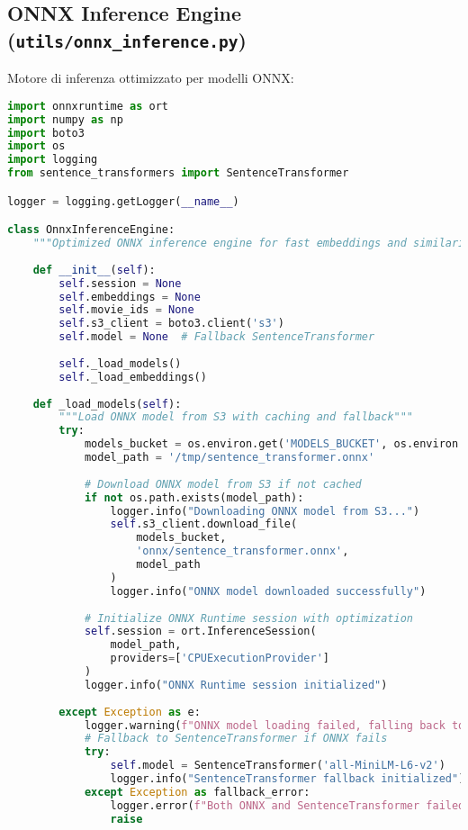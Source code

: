 \documentclass[11pt,a4paper]{article}
\begin{document}
\subsection{ONNX Inference Engine (\texttt{utils/onnx\_inference.py})}
Motore di inferenza ottimizzato per modelli ONNX:

\begin{lstlisting}[language=Python, caption=ONNX Inference Engine]
import onnxruntime as ort
import numpy as np
import boto3
import os
import logging
from sentence_transformers import SentenceTransformer

logger = logging.getLogger(__name__)

class OnnxInferenceEngine:
    """Optimized ONNX inference engine for fast embeddings and similarity"""
    
    def __init__(self):
        self.session = None
        self.embeddings = None
        self.movie_ids = None
        self.s3_client = boto3.client('s3')
        self.model = None  # Fallback SentenceTransformer
        
        self._load_models()
        self._load_embeddings()
    
    def _load_models(self):
        """Load ONNX model from S3 with caching and fallback"""
        try:
            models_bucket = os.environ.get('MODELS_BUCKET', os.environ.get('EMBEDDINGS_BUCKET'))
            model_path = '/tmp/sentence_transformer.onnx'
            
            # Download ONNX model from S3 if not cached
            if not os.path.exists(model_path):
                logger.info("Downloading ONNX model from S3...")
                self.s3_client.download_file(
                    models_bucket, 
                    'onnx/sentence_transformer.onnx',
                    model_path
                )
                logger.info("ONNX model downloaded successfully")
            
            # Initialize ONNX Runtime session with optimization
            self.session = ort.InferenceSession(
                model_path,
                providers=['CPUExecutionProvider']
            )
            logger.info("ONNX Runtime session initialized")
            
        except Exception as e:
            logger.warning(f"ONNX model loading failed, falling back to SentenceTransformer: {e}")
            # Fallback to SentenceTransformer if ONNX fails
            try:
                self.model = SentenceTransformer('all-MiniLM-L6-v2')
                logger.info("SentenceTransformer fallback initialized")
            except Exception as fallback_error:
                logger.error(f"Both ONNX and SentenceTransformer failed: {fallback_error}")
                raise
    

\end{lstlisting}
\end{document}
